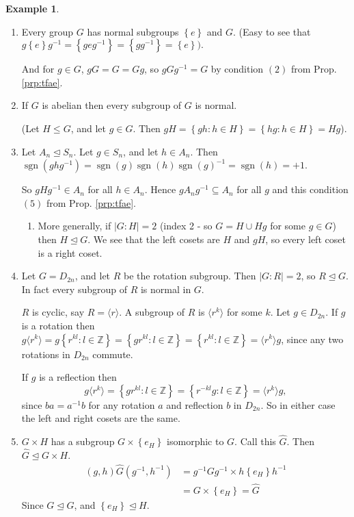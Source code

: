 \documentclass{article}
\theoremstyle{definition}
\newtheorem*{exmp}{Example}
\newcommand{\gene}[1]{\langle #1 \rangle}
\newcommand{\nsg}[2]{#1 \trianglelefteq #2}
\DeclareMathOperator{\sgn}{sgn}
\begin{document}
\begin{exmp}\hfill
  \begin{enumerate}
    \item Every group $G$ has normal subgroups $\left\{ e \right\}$ and $G$. (Easy to see that $g\left\{ e \right\}g^{-1}=\left\{ geg^{-1} \right\}=\left\{ gg^{-1} \right\}=\left\{ e \right\}).$

      And for $g \in G$, $gG = G=Gg$, so $gGg^{-1}=G$ by condition $(2)$ from Prop. \ref{prp:tfae}.

    \item If $G$ is abelian then every subgroup of $G$ is normal. 

      (Let $H \leq G$, and let $g \in G$. Then $gH=\left\{ gh:h \in H \right\}=\left\{ hg:h \in H \right\}=Hg$).

    \item Let $\nsg{A_n}{S_n}$. Let $g \in S_n$, and let $h \in A_n$. Then $\sgn \left( ghg^{-1} \right)=\sgn(g)\sgn(h)\sgn(g)^{-1}=\sgn(h)=+1$.

      So $gHg^{-1} \in A_n$ for all $h \in A_n$. Hence $gA_ng^{-1} \subseteq A_n$ for all $g$ and this condition $(5)$ from Prop. \ref{prp:tfae}.

      \begin{enumerate}
        \item More generally, if $|G:H|=2$ (index 2 -  so $G = H \cup Hg$ for some $g \in G$) then $\nsg{H}{G}$. We see that the left cosets are $H$ and $gH$, so every left coset is a right coset.
      \end{enumerate}

    \item Let $G = D_{2n}$, and let $R$ be the rotation subgroup. Then $|G:R|=2$, so $\nsg{R}{G}$. In fact every subgroup of $R$ is normal in $G$.

      $R$ is cyclic, say $R = \langle r \rangle$.
      A subgroup of $R$ is $\gene{r^k}$ for some $k$. Let $g \in D_{2n}$. If $g$ is a rotation then $g\gene{r^k}=g\left\{ r^{kl}:l \in \mathbb{Z} \right\}=\left\{ gr^{kl}:l \in \mathbb{Z} \right\}= \left\{ r^{kl}:l \in \mathbb{Z} \right\}=\gene{r^k}g$, since any two rotations in $D_{2n}$ commute.

      If $g$ is a reflection then $$g\gene{r^k}=\left\{ gr^{kl}:l \in \mathbb{Z} \right\}=\left\{ r^{-kl}g:l \in \mathbb{Z} \right\}=\gene{r^k}g,$$ since $ba=a^{-1}b$ for any rotation $a$ and reflection $b$ in $D_{2n}$. So in either case the left and right cosets are the same.

    \item $G \times H$ has a subgroup  $G \times \left\{ e_H \right\}$ isomorphic to $G$. Call this $\hat{G}$. Then $\nsg{\hat{G}}{G \times H}$. 
\begin{align*}
  (g,h)\hat{G}(g^{-1},h^{-1}) &= g^{-1}Gg^{-1} \times h\left\{ e_H \right\}h^{-1} \\
  &= G \times \left\{ e_H \right\} = \hat{G}
\end{align*}
Since $\nsg{G}{G}$, and $\nsg{\left\{ e_H \right\}}{H}$.


\end{enumerate}
\end{exmp}
\end{document}
